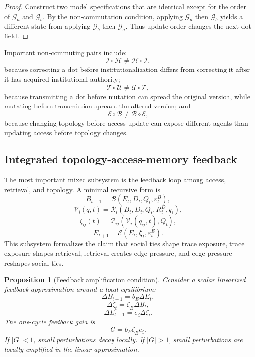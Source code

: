 \documentclass[11pt]{article}
\newtheorem{proposition}{Proposition}
\theoremstyle{remark}
\begin{document}
\begin{proof}
Construct two model specifications that are identical except for the order of \(\mathscr G_a\) and \(\mathscr G_b\). By the non-commutation condition, applying \(\mathscr G_a\) then \(\mathscr G_b\) yields a different state from applying \(\mathscr G_b\) then \(\mathscr G_a\). Thus update order changes the next dot field.
\end{proof}

Important non-commuting pairs include:
\[
\mathscr I\circ\mathscr H\neq \mathscr H\circ\mathscr I,
\]
because correcting a dot before institutionalization differs from correcting it after it has acquired institutional authority;
\[
\mathscr T\circ\mathscr U\neq \mathscr U\circ\mathscr T,
\]
because transmitting a dot before mutation can spread the original version, while mutating before transmission spreads the altered version; and
\[
\mathscr E\circ\mathscr B\neq \mathscr B\circ\mathscr E,
\]
because changing topology before access update can expose different agents than updating access before topology changes.

\subsection{Integrated topology-access-memory feedback}\label{integrated-topology-access-memory-feedback}

The most important mixed subsystem is the feedback loop among access, retrieval, and topology. A minimal recursive form is
\[
B_{t+1}=\mathscr B(E_t,D_t,Q_t,\varepsilon^B_t),
\]
\[
\mathcal V_i(q,t)=\mathscr R_i(B_t,D_t,Q_t,R_t^D,q_i),
\]
\[
\zeta_{ij}(t)=\mathscr P_{ij}(\mathcal V_i(q_{ij},t),Q_t),
\]
\[
E_{t+1}=\mathscr E(E_t,\boldsymbol{\zeta}_t,\varepsilon^E_t).
\]
This subsystem formalizes the claim that social ties shape trace exposure, trace exposure shapes retrieval, retrieval creates edge pressure, and edge pressure reshapes social ties.

\begin{proposition}[Feedback amplification condition]
Consider a scalar linearized feedback approximation around a local equilibrium:
\[
\Delta B_{t+1}=b_E\Delta E_t,
\]
\[
\Delta \zeta_t=\zeta_B\Delta B_t,
\]
\[
\Delta E_{t+1}=e_\zeta\Delta \zeta_t.
\]
The one-cycle feedback gain is
\[
G=b_E\zeta_Be_\zeta.
\]
If \(|G|<1\), small perturbations decay locally. If \(|G|>1\), small perturbations are locally amplified in the linear approximation.
\end{proposition}
\end{document}

